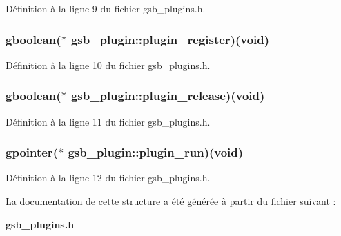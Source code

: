 Définition à la ligne 9 du fichier gsb\_\-plugins.h.

\subsubsection[{plugin\_\-register}]{\setlength{\rightskip}{0pt plus 5cm}gboolean($\ast$  {\bf gsb\_\-plugin::plugin\_\-register})(void)}\label{structgsb__plugin_ae02d02bf796da71c94136403e2de173c}


Définition à la ligne 10 du fichier gsb\_\-plugins.h.

\subsubsection[{plugin\_\-release}]{\setlength{\rightskip}{0pt plus 5cm}gboolean($\ast$  {\bf gsb\_\-plugin::plugin\_\-release})(void)}\label{structgsb__plugin_a5f80a3589473b08e138a348790ac575c}


Définition à la ligne 11 du fichier gsb\_\-plugins.h.

\subsubsection[{plugin\_\-run}]{\setlength{\rightskip}{0pt plus 5cm}gpointer($\ast$  {\bf gsb\_\-plugin::plugin\_\-run})(void)}\label{structgsb__plugin_a332c96f30698012f23f9f039d754b1d6}


Définition à la ligne 12 du fichier gsb\_\-plugins.h.



La documentation de cette structure a été générée à partir du fichier suivant :\begin{DoxyCompactItemize}
\item 
{\bf gsb\_\-plugins.h}\end{DoxyCompactItemize}
